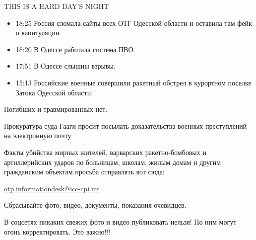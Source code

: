  
 
 
 
 
\zzSecCmt

\begin{itemize} %

THIS IS A HARD DAY'S NIGHT

\begin{itemize}
  \item 18:25 Россия сломала сайты всех ОТГ Одесской области и оставила там фейк о капитуляции.
  \item 18:20 В Одессе работала система ПВО.
  \item 17:51 В Одессе слышны взрывы.
  \item 15:13 Российские военные совершили ракетный обстрел в курортном поселке Затока Одесской области.
\end{itemize}

Погибших и травмированных нет.


Прокуратура суда Гааги просит посылать доказательства военных преступлений на
электронную почту

Факты убийства мирных жителей, варварских ракетно-бомбовых и артиллерийских
ударов по больницам, школам, жилым домам и другим гражданским объектам просьба
отправлять вот сюда:

\url{otp.informationdesk@icc-cpi.int}

Сбрасывайте фото, видео, документы, показания очевидцев.

В соцсетях никаких свежих фото и видео публиковать нельзя! По ним могут огонь
корректировать. Это важно!!!
\end{itemize} %
